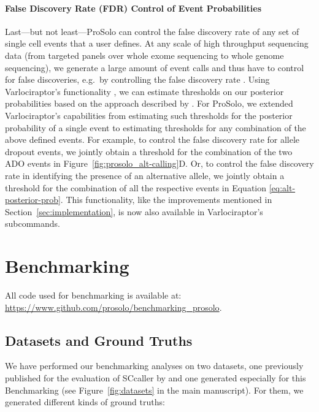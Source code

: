 \documentclass[authoryear,preprint,11pt]{scrartcl}
\begin{document}
\paragraph{False Discovery Rate (FDR) Control of Event Probabilities} \label{sec:fdr}

Last---but not least---ProSolo can control the false discovery rate of any set of single cell events that a user defines.
At any scale of high throughput sequencing data (from targeted panels over whole exome sequencing to whole genome sequencing), we generate a large amount of event calls and thus have to control for false discoveries, e.g.~by controlling the false discovery rate \citep{benjamini_controlling_1995}.
Using Varlociraptor's functionality \citep{koster_varlociraptor_2020}, we can estimate thresholds on our posterior probabilities based on the approach described by \cite{muller_optimal_2004,muller_fdr_2006}.
For ProSolo, we extended Varlociraptor's capabilities from estimating such thresholds for the posterior probability of a single event to estimating thresholds for any combination of the above defined events.
For example, to control the false discovery rate for allele dropout events, we jointly obtain a threshold for the combination of the two ADO events in Figure~\ref{fig:prosolo_alt-calling}D.
Or, to control the false discovery rate in identifying the presence of an alternative allele, we jointly obtain a threshold for the combination of all the respective events in Equation \ref{eq:alt-posterior-prob}. 
This functionality, like the improvements mentioned in Section~\ref{sec:implementation}, is now also available in Varlociraptor's subcommands.


\section{Benchmarking} \label{sec:suppl-benchmarking}

All code used for benchmarking is available at: \url{https://www.github.com/prosolo/benchmarking_prosolo}.

\subsection{Datasets and Ground Truths} \label{sec:suppl-datasets}

We have performed our benchmarking analyses on two datasets, one previously published for the evaluation of SCcaller by \cite{dong_accurate_2017} and one generated especially for this Benchmarking (see Figure~\ref{fig:datasets} in the main manuscript).
For them, we generated different kinds of ground truths:\\
\end{document}

